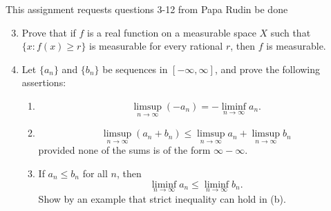 \documentclass{article}
\begin{document}
This assignment requests questions 3-12 from Papa Rudin be done
\begin{enumerate} 

    \setcounter{enumi}{2}
    \item Prove that if $f$ is a real function on a measurable space $X$ such that $\{x : f(x) \geq r\}$ is measurable for every rational $r$, then $f$ is measurable.
    \item  Let $\{a_n\}$ and $\{b_n\}$ be sequences in $[-\infty, \infty]$, and prove the following assertions:
\begin{enumerate}
    \item $$\limsup_{n \to \infty} (-a_n) = -\liminf_{n \to \infty} a_n.$$
    \item $$ \limsup_{n \to \infty} (a_n + b_n) \leq \limsup_{n \to \infty} a_n + \limsup_{n \to \infty} b_n$$ provided none of the sums is of the form $\infty - \infty$.
    \item If $a_n \leq b_n$ for all $n$, then
    $$\liminf_{n \to \infty} a_n \leq \liminf_{n \to \infty} b_n.$$
    Show by an example that strict inequality can hold in (b).
\end{enumerate}

\end{enumerate}
\end{document}

